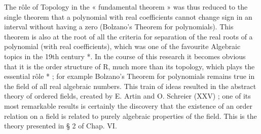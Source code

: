 The rôle of Topology in the « fundamental theorem » was thus reduced to the single theorem that a polynomial with real coefficients cannot change sign in an interval without having a zero (Bolzano's Theorem for polynomials). This theorem is also at the root of all the criteria for separation of the real roots of a polynomial (with real coefficients), which was one of the favourite Algebraic topics in the 19th century *. In the course of this research it becomes obvious that it is the order structure of R, much more than its topology, which plays the essential rôle * ; for example Bolzano's Theorem for polynomials remains true in the field of all real algebraic numbers. This train of ideas resulted in the abstract theory of ordered fields, created by E. Artin and O. Schreier (XXV) ; one of its most remarkable results is certainly the discovery that the existence of an order relation on a field is related to purely algebraic properties of the field. This is the theory presented in § 2 of Chap. VI.

